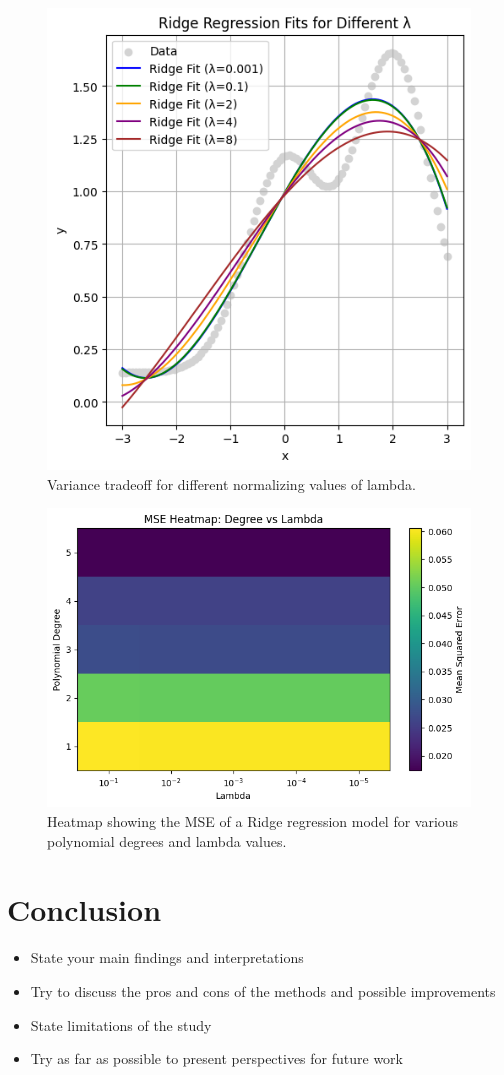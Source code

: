 \documentclass[amssymb,twocolumn,aps]{revtex4}
\begin{document}
\begin{figure}[h]
    \centering
    \includegraphics[width=0.5\linewidth]{Figures/bvt.png}
    \caption{Variance tradeoff for different normalizing values of lambda.}
    \label{fig:bvt}
\end{figure}
\begin{figure}[h]
    \centering
    \includegraphics[width=1.0\linewidth]{Figures/mse_heatmap.png}
    \caption{Heatmap showing the MSE of a Ridge regression model for various polynomial degrees and lambda values.}
    \label{fig:mse_heatmap}
\end{figure}

\section{Conclusion}\label{section:conclusion} 
\begin{itemize}
    \item State your main findings and interpretations
    \item Try to discuss the pros and cons of the methods and possible improvements
    \item State limitations of the study
    \item Try as far as possible to present perspectives for future work
\end{itemize}


\end{document}
